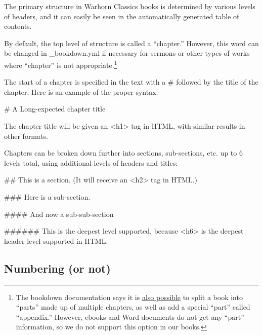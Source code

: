 \documentclass[
  english,
]{book}
\newenvironment{Shaded}{\begin{snugshade}}{\end{snugshade}}
\newcommand{\FunctionTok}[1]{\textcolor[rgb]{0.00,0.00,0.00}{#1}}
\begin{document}
The primary structure in Warhorn Classics books is determined by various levels of headers, and it can easily be seen in the automatically generated table of contents.

By default, the top level of structure is called a ``chapter.'' However, this word can be changed in \_bookdown.yml if necessary for sermons or other types of works where ``chapter'' is not appropriate.\footnote{The bookdown documentation says it is \href{https://bookdown.org/yihui/bookdown/markdown-extensions-by-bookdown.html\#special-headers}{also possible} to split a book into ``parts'' made up of multiple chapters, as well as add a special ``part'' called ``appendix.'' However, ebooks and Word documents do not get any ``part'' information, so we do not support this option in our books.}

The start of a chapter is specified in the text with a \# followed by the title of the chapter. Here is an example of the proper syntax:

\begin{Shaded}
\begin{Highlighting}[]
\FunctionTok{\# A Long{-}expected chapter title}
\end{Highlighting}
\end{Shaded}

The chapter title will be given an \textless h1\textgreater{} tag in HTML, with similar results in other formats.

Chapters can be broken down further into sections, sub-sections, etc. up to 6 levels total, using additional levels of headers and titles:

\begin{Shaded}
\begin{Highlighting}[]
\FunctionTok{\#\# This is a section. (It will receive an \textless{}h2\textgreater{} tag in HTML.)}

\FunctionTok{\#\#\# Here is a sub{-}section.}

\FunctionTok{\#\#\#\# And now a sub{-}sub{-}section}

\FunctionTok{\#\#\#\#\#\# This is the deepest level supported, because \textless{}h6\textgreater{} is the deepest header level supported in HTML.}
\end{Highlighting}
\end{Shaded}

\hypertarget{numbering-or-not}{%
\subsection{Numbering (or not)}\label{numbering-or-not}}
\end{document}
